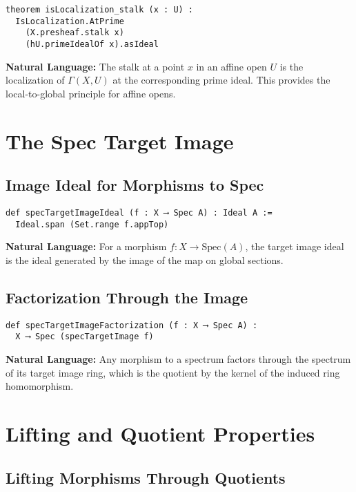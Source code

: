 \documentclass{article}
\theoremstyle{definition}
\begin{document}
\begin{lstlisting}
theorem isLocalization_stalk (x : U) :
  IsLocalization.AtPrime
    (X.presheaf.stalk x)
    (hU.primeIdealOf x).asIdeal
\end{lstlisting}

\textbf{Natural Language:} The stalk at a point $x$ in an affine open $U$ is the localization of $\Gamma(X, U)$ at the corresponding prime ideal. This provides the local-to-global principle for affine opens.

\section{The Spec Target Image}

\subsection{Image Ideal for Morphisms to Spec}

\begin{lstlisting}
def specTargetImageIdeal (f : X ⟶ Spec A) : Ideal A :=
  Ideal.span (Set.range f.appTop)
\end{lstlisting}

\textbf{Natural Language:} For a morphism $f: X \to \mathrm{Spec}(A)$, the target image ideal is the ideal generated by the image of the map on global sections.

\subsection{Factorization Through the Image}

\begin{lstlisting}
def specTargetImageFactorization (f : X ⟶ Spec A) :
  X ⟶ Spec (specTargetImage f)
\end{lstlisting}

\textbf{Natural Language:} Any morphism to a spectrum factors through the spectrum of its target image ring, which is the quotient by the kernel of the induced ring homomorphism.

\section{Lifting and Quotient Properties}

\subsection{Lifting Morphisms Through Quotients}
\end{document}
